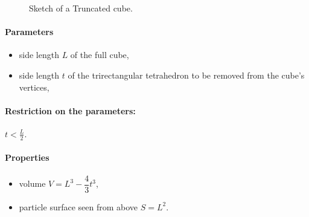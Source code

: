 \begin{figure}[ht]
\hfill
{}
\hfill
{}
\hfill
\caption{Sketch of a Truncated cube.}
\label{fig:truncatedcube}
\end{figure}

\FloatBarrier

\paragraph{Parameters}
\begin{itemize}
\item side length $L$ of the full cube, 
\item side length $t$ of the trirectangular tetrahedron to be removed from the cube's vertices, 

\end{itemize}

\paragraph{Restriction on the parameters:} $t < \frac{L}{2} $.

\paragraph{Properties}
\begin{itemize}
\item volume $V = L^3 - \dfrac{4}{3}t^3$,
\item particle surface seen from above $S = L^2$.
\end{itemize}

